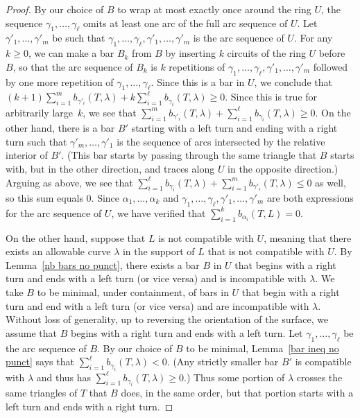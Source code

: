 \documentclass{amsart}
\theoremstyle{definition}
\theoremstyle{remark}
\numberwithin{equation}{section}
\newcommand{\0}{{\mathbf{0}}}
\begin{document}
\begin{proof}
By our choice of $B$ to wrap at most exactly once around the ring $U$, the sequence $\gamma_1,\ldots,\gamma_\ell$ omits at least one arc of the full arc sequence of $U$.
Let $\gamma'_1,\ldots,\gamma'_m$ be such that $\gamma_1,\ldots,\gamma_\ell,\gamma'_1,\ldots,\gamma'_m$ is the arc sequence of $U$.
For any $k\ge0$, we can make a bar $B_k$ from $B$ by inserting $k$ circuits of the ring $U$ before $B$, so that the arc sequence of $B_k$ is $k$ repetitions of $\gamma_1,\ldots,\gamma_\ell,\gamma'_1,\ldots,\gamma'_m$ followed by one more repetition of $\gamma_1,\ldots,\gamma_\ell$.
Since this is a bar in $U$, we conclude that ${(k+1)\sum_{i=1}^m b_{\gamma'_i}(T,\lambda)}+{k\sum_{i=1}^\ell b_{\gamma_i}(T,\lambda)\geq 0}$.
Since this is true for arbitrarily large~$k$, we see that $\sum_{i=1}^m b_{\gamma'_i}(T,\lambda)+{\sum_{i=1}^\ell b_{\gamma_i}(T,\lambda)\geq 0}$.
On the other hand, there is a bar $B'$ starting with a left turn and ending with a right turn such that $\gamma'_m,\ldots,\gamma'_1$ is the sequence of arcs intersected by the relative interior of $B'$.
(This bar starts by passing through the same triangle that $B$ starts with, but in the other direction, and traces along $U$ in the opposite direction.)
Arguing as above, we see that $\sum_{i=1}^\ell b_{\gamma_i}(T,\lambda)+\sum_{i=1}^m b_{\gamma'_i}(T,\lambda)\leq 0$ as well, so this sum equals $0$.
Since $\alpha_1,\ldots,\alpha_k$ and $\gamma_1,\ldots,\gamma_\ell,\gamma'_1,\ldots,\gamma'_m$ are both expressions for the arc sequence of $U$, we have verified that $\sum_{i=1}^kb_{\alpha_i}(T,L)=0$.

On the other hand, suppose that $L$ is not compatible with $U$, meaning that there exists an allowable curve $\lambda$ in the support of $L$ that is not compatible with $U$.
By Lemma~\ref{nb bars no punct}, there exists a bar $B$ in $U$ that begins with a right turn and ends with a left turn (or vice versa) and is incompatible with $\lambda$.
We take $B$ to be minimal, under containment, of bars in $U$ that begin with a right turn and end with a left turn (or vice versa) and are incompatible with $\lambda$.
Without loss of generality, up to reversing the orientation of the surface, we assume that $B$ begins with a right turn and ends with a left turn.
Let $\gamma_1,\ldots,\gamma_\ell$ be the arc sequence of $B$.
By our choice of $B$ to be minimal, Lemma~\ref{bar ineq no punct} says that $\sum_{i=1}^\ell b_{\gamma_i}(T,\lambda)<0$.
(Any strictly smaller bar $B'$ is compatible with $\lambda$ and thus has $\sum_{i=1}^\ell b_{\gamma_i}(T,\lambda)\ge0$.)
Thus some portion of $\lambda$ crosses the same triangles of $T$ that $B$ does, in the same order, but that portion starts with a left turn and ends with a right turn.


\end{proof}
\end{document}
